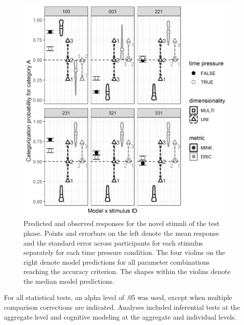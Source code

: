 \documentclass[a4paper,man,natbib]{apa6}
\begin{document}
\begin{figure}[htbp]
\centering
\includegraphics[width = \textwidth]{fig_pred_obs_agg.png}
\caption{Predicted and observed responses for the novel stimuli of the test phase. Points and errorbars on the left denote the mean response and the standard error across participants for each stimulus separately for each time pressure condition. The four violins on the right denote model predictions for all parameter combinations reaching the accuracy criterion. The shapes within the violins denote the median model predictions.}
\label{fig:pred_obs_agg}
\end{figure}

For all statistical tests, an alpha level of .05 was used, except when multiple comparison corrections are indicated. Analyses included inferential tests at the aggregate level and cognitive modeling at the aggregate and individual levels.
\end{document}
